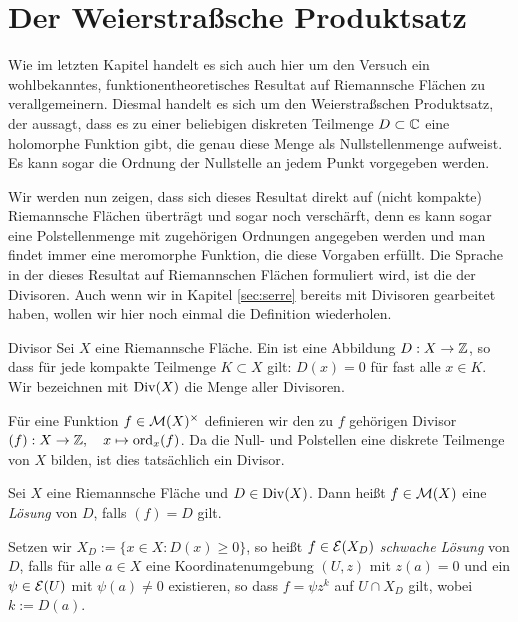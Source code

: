
\section{Der Weierstraßsche Produktsatz}
\label{sec:Weierstrass}

Wie im letzten Kapitel handelt es sich auch hier um den Versuch ein
wohlbekanntes, funktionentheoretisches Resultat auf Riemannsche
Flächen zu verallgemeinern. Diesmal handelt es sich um den
Weierstraßschen Produktsatz, der aussagt, dass es zu einer beliebigen
diskreten Teilmenge $D \subset \mathbb{C}$ eine holomorphe Funktion gibt, die
genau diese Menge als Nullstellenmenge aufweist. Es kann sogar die
Ordnung der Nullstelle an jedem Punkt vorgegeben werden.

Wir werden nun zeigen, dass sich dieses Resultat direkt auf (nicht
kompakte) Riemannsche Flächen überträgt und sogar noch verschärft,
denn es kann sogar eine Polstellenmenge mit zugehörigen Ordnungen
angegeben werden und man findet immer eine meromorphe Funktion, die
diese Vorgaben erfüllt. Die Sprache in der dieses Resultat auf
Riemannschen Flächen formuliert wird, ist die der Divisoren. Auch wenn
wir in Kapitel \ref{sec:serre} bereits mit Divisoren gearbeitet haben,
wollen wir hier noch einmal die Definition wiederholen.

\begin{defin}{Divisor}
  Sei $X$ eine Riemannsche Fläche. Ein  ist eine
  Abbildung $D: X \rightarrow \mathbb{Z}$, so dass für jede kompakte Teilmenge $K
  \subset X$ gilt: $D(x) = 0$ für fast alle $x \in K$. 
  Wir bezeichnen mit $\operatorname{Div}(X)$ die Menge aller Divisoren.
  
  Für eine Funktion $f \in \mathcal{M}(X)^\times$ definieren wir den zu $f$
  gehörigen Divisor $(f): X \rightarrow \mathbb{Z}, \quad x \mapsto \operatorname{ord}_x(f)$. Da die
  Null- und Polstellen eine diskrete Teilmenge von $X$ bilden, ist
  dies tatsächlich ein Divisor.
\end{defin}

\begin{defin}
  \label{def:divisor-lsg}
  Sei $X$ eine Riemannsche Fläche und $D \in \operatorname{Div}(X)$. Dann heißt $f
  \in \mathcal{M}(X)$ eine \emph{Lösung} von $D$, falls $(f) = D$ gilt.
  
  Setzen wir $X_D := \{x \in X: D(x) \geq 0 \}$, so heißt $f \in
  \mathcal{E}(X_D)$ \emph{schwache Lösung} von $D$, falls für alle $a \in X$
  eine Koordinatenumgebung $(U,z)$ mit $z(a) = 0$ und ein $\psi \in
  \mathcal{E}(U)$ mit $\psi(a) \neq 0$ existieren, so dass $f = \psi z^k$
  auf $ U \cap X_D$ gilt, wobei $k := D(a)$.
\end{defin}

